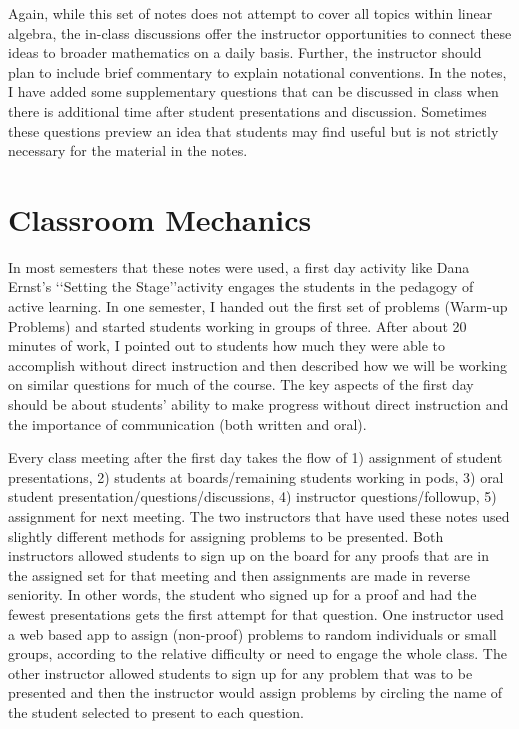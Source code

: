 \begin{annotation}
Again, while this set of notes does not attempt to cover all topics within linear algebra, the in-class discussions offer the instructor opportunities to connect these ideas to broader mathematics on a daily basis. Further, the instructor should plan to include brief commentary  to explain notational conventions. In the notes, I have added some supplementary  questions that can be discussed in class when there is additional time after student presentations and discussion. Sometimes these questions preview an idea that students may find useful but is not strictly necessary for the material in the notes.

\section{Classroom Mechanics}
In most semesters that these notes were used, a first day activity like Dana Ernst's \lq\lq{Setting the Stage}\rq\rq  activity engages the students in the pedagogy of active learning. In one semester, I handed out the first set of problems (Warm-up Problems) and started students working  in groups of three. After about 20 minutes of work, I pointed out to students how much they were able to accomplish  without direct instruction and then described how we will be working on similar questions for much of the course. The key aspects of the first day should be about students' ability to make progress without direct instruction and the importance of communication (both written and oral).

Every class meeting after the first day  takes the flow of 1) assignment of student presentations, 2) students at boards/remaining students working in pods, 3) oral student presentation/questions/discussions, 4) instructor questions/followup, 5) assignment for next meeting. The two instructors that have used these notes used slightly different methods for assigning problems to be presented. Both instructors allowed students to sign up on the board for any proofs that are in the assigned set for that meeting and then assignments are made in reverse seniority. In other words, the student who signed up for a proof and had the fewest presentations gets the first attempt for that question. One instructor used a web based app to assign (non-proof) problems to random individuals or small groups, according to the relative difficulty or need to engage the whole class. The other instructor allowed students to sign up for any problem that was to be presented and then the instructor would assign problems by circling the name of the student selected to present to each question.


\end{annotation}
